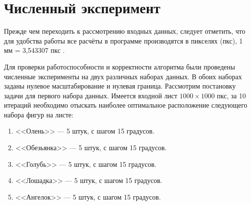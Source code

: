 \documentclass[14pt]{extarticle}
\begin{document}
	\section{Численный эксперимент}
	Прежде чем переходить к рассмотрению входных данных, следует отметить, что для удобства работы все расчёты в программе производятся в пикселях (пкс), 1 мм = 3,543307 пкс \cite{SVG}.
	
	Для проверки работоспособности и корректности алгоритма были проведены численные эксперименты на двух различных наборах данных. В обоих наборах заданы нулевое масштабирование и нулевая граница. Рассмотрим постановку задачи для первого набора данных. Имеется входной лист $1000\times1000$ пкс, за 10 итераций необходимо отыскать наиболее оптимальное расположение следующего набора фигур на листе:
	\begin{enumerate}
		\item <<Олень>> --- 5 штук, с шагом 15 градусов.
		\item <<Обезьянка>> --- 5 штук, с шагом 15 градусов.
		\item <<Голубь>> --- 5 штук, с шагом 15 градусов.
		\item <<Лошадка>> --- 5 штук, с шагом 15 градусов.
		\item <<Ангелок>> --- 5 штук, с шагом 15 градусов.
	\end{enumerate}
\end{document}
